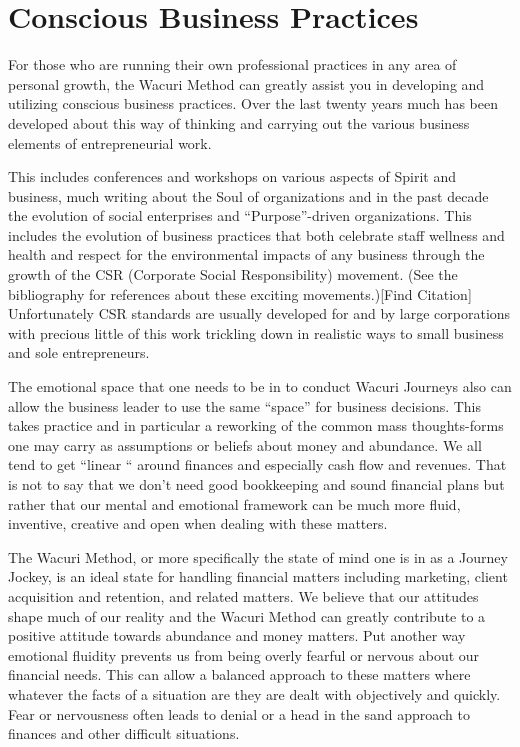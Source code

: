 \documentclass[12pt]{book}
\begin{document}
\chapter{Conscious Business Practices}

For those who are running their own professional practices in any area
of personal growth, the Wacuri Method can greatly assist you in
developing and utilizing conscious business practices. Over the last
twenty years much has been developed about this way of thinking and
carrying out the various business elements of entrepreneurial work.

This includes conferences and workshops on various aspects of Spirit
and business, much writing about the Soul of organizations and in the
past decade the evolution of social enterprises and ``Purpose''-driven
organizations. This includes the evolution of business practices that
both celebrate staff wellness and health and respect for the
environmental impacts of any business through the growth of the CSR
(Corporate Social Responsibility) movement.  (See the bibliography for
references about these exciting movements.)[Find Citation] Unfortunately CSR
standards are usually developed for and by large corporations with
precious little of this work trickling down in realistic ways to small
business and sole entrepreneurs.

The emotional space that one needs to be in to conduct Wacuri Journeys also can
allow the business leader to use the same “space” for business
decisions. This takes practice and in particular a reworking of the
common mass thoughts-forms one may carry as assumptions or beliefs
about money and abundance. We all tend to get “linear “ around
finances and especially cash flow and revenues. That is not to say
that we don't need good bookkeeping and sound financial plans but
rather that our mental and emotional framework can be much more fluid,
inventive, creative and open when dealing with these matters.

The Wacuri Method, or more specifically the state of mind one is in as
a Journey Jockey, is an ideal state for handling financial matters
including marketing, client acquisition and retention, and related
matters. We believe that our attitudes shape much of our reality and
the Wacuri Method can greatly contribute to a positive
attitude towards abundance and money matters. Put another way
emotional fluidity prevents us from being overly fearful or nervous
about our financial needs. This can allow a balanced approach to these
matters where whatever the facts of a situation are they are dealt
with objectively and quickly. Fear or nervousness often leads to
denial or a head in the sand approach to finances and other difficult
situations.
\end{document}

